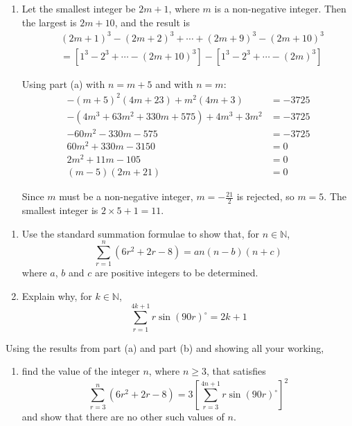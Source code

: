 \documentclass[leqno]{article}
\begin{document}
\begin{enumerate}[
  label=\textbf{\arabic*.},
  leftmargin=*,
  topsep=0pt,
  partopsep=0pt,
  parsep=0pt
]
\begin{djsSolution}
\begin{enumerate}[label=\textbf{(\alph*)}, start=1]
as required.

  \item Let the smallest integer be \(2m+1\), where \(m\) is a non-negative integer. Then the largest is \(2m+10\), and the result is
\begin{align*}
&(2m+1)^3-(2m+2)^3+\cdots+(2m+9)^3-(2m+10)^3\\
&=\left[1^3-2^3+\cdots-(2m+10)^3\right]-\left[1^3-2^3+\cdots-(2m)^3\right]
\end{align*}

Using part (a) with \(n=m+5\) and with \(n=m\):
\begin{align*}
-(m+5)^2(4m+23)+m^2(4m+3)&=-3725\\
-\left(4m^3+63m^2+330m+575\right)+4m^3+3m^2&=-3725\\
-60m^2-330m-575&=-3725\\
60m^2+330m-3150&=0\\
2m^2+11m-105&=0\\
(m-5)(2m+21)&=0
\end{align*}

Since \(m\) must be a non-negative integer, \(m=-\frac{21}{2}\) is rejected, so \(m=5\). The smallest integer is \(2\times5+1=11\).
\end{enumerate}
\end{djsSolution}

\newpage

\questionitem

\begin{enumerate}[label=\textbf{(\alph*)}]
  \item Use the standard summation formulae to show that, for $n \in \mathbb{N}$,
  \[\sum_{r=1}^{n} \left(6r^2 + 2r - 8\right) = an(n-b)(n+c)\]
  where $a$, $b$ and $c$ are positive integers to be determined.  \\
  \item Explain why, for $k \in \mathbb{N}$,
  \[\sum_{r=1}^{4k+1} r\sin\left(90r\right)^\circ = 2k+1\] 
\end{enumerate}
Using the results from part (a) and part (b) and showing all your working, \\
\begin{enumerate}[label=\textbf{(\alph*)}, resume]
  \item find the value of the integer $n$, where $n \geq 3$, that satisfies
  \[\sum_{r=3}^{n} \left(6r^2 + 2r - 8\right) = 3\left[\sum_{r=3}^{4n+1} r\sin\left(90r\right)^\circ\right]^2\]
  and show that there are no other such values of $n$.  \\
\end{enumerate}


\end{enumerate}
\end{document}
